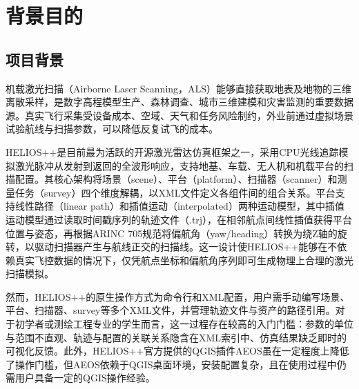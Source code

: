 \documentclass[a4paper,fleqn]{cas-sc}
\begin{document}
\let\WriteBookmarks\relax
\def\floatpagepagefraction{1}
\def\textpagefraction{.001}

\shorttitle{}
\title[mode=title]{}




\MakeNJFUTitlePage[UseDocTitle]
\tableofcontents
\newpage

\section{背景目的}

\subsection{项目背景}

机载激光扫描（Airborne Laser Scanning，ALS）能够直接获取地表及地物的三维离散采样，是数字高程模型生产、森林调查、城市三维建模和灾害监测的重要数据源。真实飞行采集受设备成本、空域、天气和任务风险制约，外业前通过虚拟场景试验航线与扫描参数，可以降低反复试飞的成本。

HELIOS++是目前最为活跃的开源激光雷达仿真框架之一，采用CPU光线追踪模拟激光脉冲从发射到返回的全波形响应，支持地基、车载、无人机和机载平台的扫描配置\citep{heliosPlusPlus,heliosPlusPlus2}。其核心架构将场景（scene）、平台（platform）、扫描器（scanner）和测量任务（survey）四个维度解耦，以XML文件定义各组件间的组合关系。平台支持线性路径（linear path）和插值运动（interpolated）两种运动模型，其中插值运动模型通过读取时间戳序列的轨迹文件（.trj），在相邻航点间线性插值获得平台位置与姿态，再根据ARINC 705规范将偏航角（yaw/heading）转换为绕Z轴的旋转，以驱动扫描器产生与航线正交的扫描线。这一设计使HELIOS++能够在不依赖真实飞控数据的情况下，仅凭航点坐标和偏航角序列即可生成物理上合理的激光扫描模拟。

然而，HELIOS++的原生操作方式为命令行和XML配置，用户需手动编写场景、平台、扫描器、survey等多个XML文件，并管理轨迹文件与资产的路径引用。对于初学者或测绘工程专业的学生而言，这一过程存在较高的入门门槛：参数的单位与范围不直观、轨迹与配置的关联关系隐含在XML索引中、仿真结果缺乏即时的可视化反馈。此外，HELIOS++官方提供的QGIS插件AEOS\citep{aeos}虽在一定程度上降低了操作门槛，但AEOS依赖于QGIS桌面环境，安装配置复杂，且在使用过程中仍需用户具备一定的QGIS操作经验。
\end{document}

